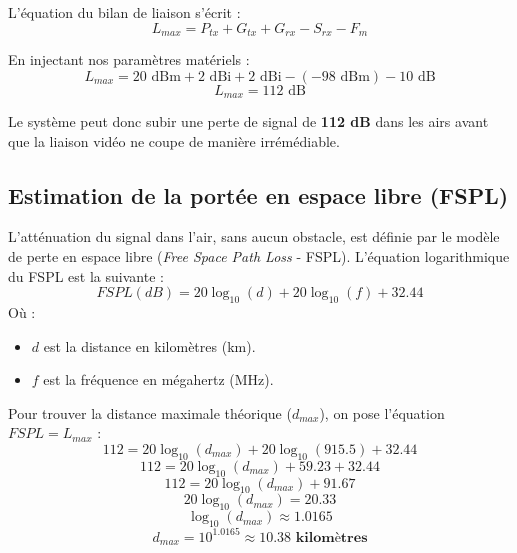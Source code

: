 L'équation du bilan de liaison s'écrit :
$$L_{max} = P_{tx} + G_{tx} + G_{rx} - S_{rx} - F_m$$

En injectant nos paramètres matériels :
$$L_{max} = 20\text{ dBm} + 2\text{ dBi} + 2\text{ dBi} - (-98\text{ dBm}) - 10\text{ dB}$$
$$L_{max} = 112\text{ dB}$$

Le système peut donc subir une perte de signal de \textbf{112 dB} dans les airs avant que la liaison vidéo ne 
coupe de manière irrémédiable.

\subsection{Estimation de la portée en espace libre (FSPL)}
L'atténuation du signal dans l'air, sans aucun obstacle, est définie par le modèle de perte en espace libre 
(\textit{Free Space Path Loss} - FSPL). L'équation logarithmique du FSPL est la suivante :
$$FSPL(dB) = 20 \log_{10}(d) + 20 \log_{10}(f) + 32.44$$
Où :
\begin{itemize}
    \item $d$ est la distance en kilomètres (km).
    \item $f$ est la fréquence en mégahertz (MHz).
\end{itemize}

Pour trouver la distance maximale théorique ($d_{max}$), on pose l'équation $FSPL = L_{max}$ :
$$112 = 20 \log_{10}(d_{max}) + 20 \log_{10}(915.5) + 32.44$$
$$112 = 20 \log_{10}(d_{max}) + 59.23 + 32.44$$
$$112 = 20 \log_{10}(d_{max}) + 91.67$$
$$20 \log_{10}(d_{max}) = 20.33$$
$$\log_{10}(d_{max}) \approx 1.0165$$
$$d_{max} = 10^{1.0165} \approx \mathbf{10.38 \text{ kilomètres}}$$

